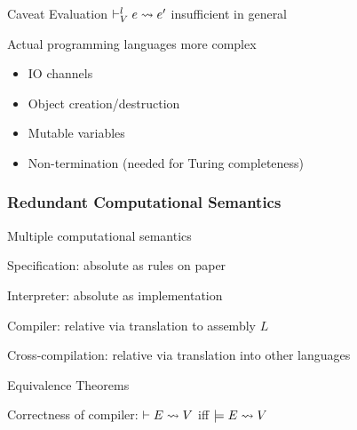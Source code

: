 \begin{frame}{Caveat}
Evaluation $\vdash^l_V e\rightsquigarrow e'$ insufficient in general

Actual programming languages more complex
\begin{itemize}
\item IO channels
\item Object creation/destruction
\item Mutable variables
\item Non-termination (needed for Turing completeness)
\end{itemize}
\end{frame}

\begin{frame}\frametitle{Redundant Computational Semantics}
\begin{blockitems}{Multiple computational semantics}
\item Specification: absolute as rules on paper
\item Interpreter: absolute as implementation
\item Compiler: relative via translation to assembly $L$
\item Cross-compilation: relative via translation into other languages
\end{blockitems}

\begin{blockitems}{Equivalence Theorems}
\item Correctness of compiler: $\vdash E\rightsquigarrow V$ iff $\models E\rightsquigarrow V$
\end{blockitems}
\end{frame}

